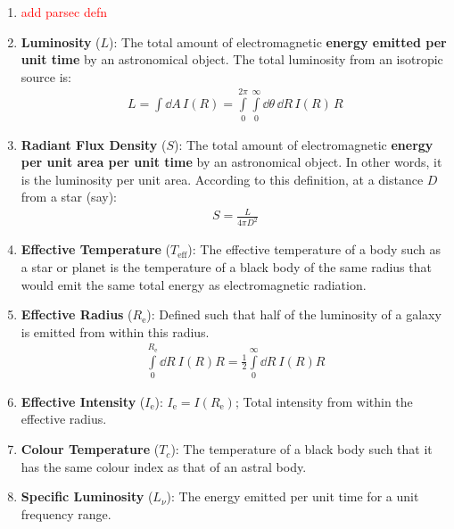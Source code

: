 \documentclass[a4paper,11pt]{report}
\newcommand{\red}[1]{\textcolor{red}{#1}}
\newcommand{\tb}[1]{\textbf{#1}}
\newcommand{\Ieff}{I_\text{e}}
\newcommand{\Reff}{{R_\text{e}}}
\begin{document}
\begin{enumerate}[leftmargin=*, label=\roman*., itemsep=0.8em]
  \item \red{add parsec defn}
    
  \item \tb{Luminosity} ($L$): The total amount of electromagnetic \textbf{energy emitted per unit time} by an astronomical object. The total luminosity from an isotropic source is:
    \begin{align*}
      L = \int \dd A \, I(R) = \int\limits_0^{2\pi} \int\limits_0^\infty \dd \theta \, \dd R \, I(R) \, R
    \end{align*}
    
  \item \tb{Radiant Flux Density} ($S$): The total amount of electromagnetic \textbf{energy per unit area per unit time} by an astronomical object. In other words, it is the luminosity per unit area. According to this definition, at a distance $D$ from a star (say):
    \begin{align*}
      S = \frac{L}{4 \pi D^2}
    \end{align*}
    
  \item \tb{Effective Temperature} ($T_\text{eff}$): The effective temperature of a body such as a star or planet is the temperature of a black body of the same radius that would emit the same total energy as electromagnetic radiation. \label{def:effective temp}
    
  \item \tb{Effective Radius} ($\Reff$): Defined such that half of the luminosity of a galaxy is emitted from within this radius.
  \begin{align*}
    \int\limits_0^\Reff \dd R \ I(R) R = \frac{1}{2} \int\limits_0^\infty \dd R \ I(R) R
  \end{align*} \label{def:effective radius}
  
\item \tb{Effective Intensity} ($\Ieff$): $\Ieff = I(\Reff)$; Total intensity from within the effective radius. \label{def:effective intensity}
    
  \item \tb{Colour Temperature} ($T_c$): The temperature of a black body such that it has the same colour index as that of an astral body. \label{def:colour temp}
    
  \item \tb{Specific Luminosity} ($L_\nu$): The energy emitted per unit time for a unit frequency range.\label{def:specific luminosity}
    

\end{enumerate}
\end{document}
